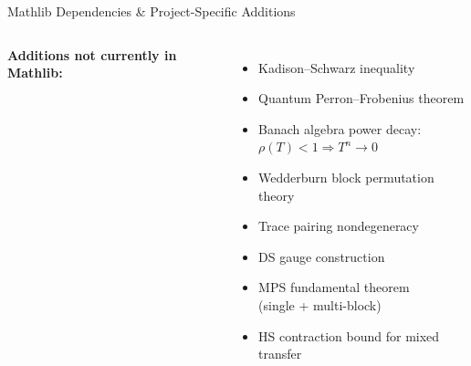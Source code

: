 \documentclass[aspectratio=169,10pt]{beamer}
\begin{document}
\begin{frame}{Mathlib Dependencies \& Project-Specific Additions}
\begin{columns}[T]
        \textbf{\textcolor{leangreen}{Additions not currently in Mathlib:}}
        \begin{itemize}\itemsep0.08em\scriptsize
            \item[\textcolor{leangreen}{\checkmark}] Kadison--Schwarz inequality
            \item[\textcolor{leangreen}{\checkmark}] Quantum Perron--Frobenius theorem
            \item[\textcolor{leangreen}{\checkmark}] Banach algebra power decay:\\
                $\rho(T) < 1 \Rightarrow T^n \to 0$
            \item[\textcolor{leangreen}{\checkmark}] Wedderburn block permutation theory
            \item[\textcolor{leangreen}{\checkmark}] Trace pairing nondegeneracy
            \item[\textcolor{leangreen}{\checkmark}] DS gauge construction
            \item[\textcolor{leangreen}{\checkmark}] MPS fundamental theorem\\
                (single + multi-block)
            \item[\textcolor{leangreen}{\checkmark}] HS contraction bound for mixed transfer
        \end{itemize}
    \end{columns}

    \vspace{0.2em}
    \begin{center}
    \end{center}
\end{frame}


\end{document}
